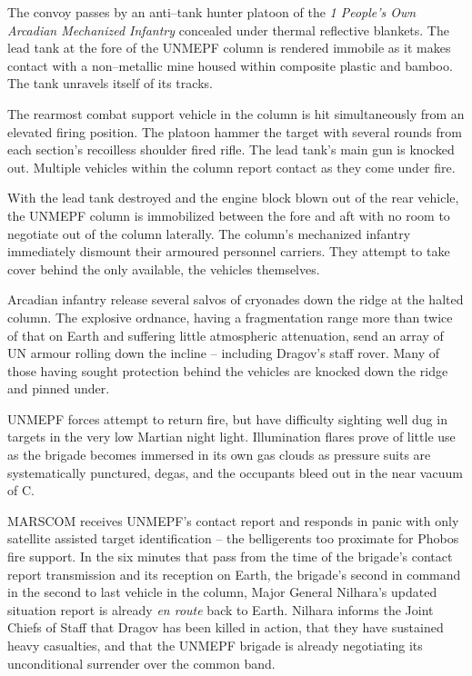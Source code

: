 The convoy passes by an anti--tank hunter platoon of the {\it 1 People's Own Arcadian Mechanized Infantry} concealed under thermal reflective blankets. The lead tank at the fore of the UNMEPF column is rendered immobile as it makes contact with a non--metallic mine housed within composite plastic and bamboo. The tank unravels itself of its tracks.

The rearmost combat support vehicle in the column is hit simultaneously from an elevated firing position. The platoon hammer the target with several rounds from each section's recoilless shoulder fired rifle. The lead tank's main gun is knocked out. Multiple vehicles within the column report contact as they come under fire.

With the lead tank destroyed and the engine block blown out of the rear vehicle, the UNMEPF column is immobilized between the fore and aft with no room to negotiate out of the column laterally. The column's mechanized infantry immediately dismount their armoured personnel carriers. They attempt to take cover behind the only available, the vehicles themselves. 

Arcadian infantry release several salvos of cryonades down the ridge at the halted column. The explosive ordnance, having a fragmentation range more than twice of that on Earth and suffering little atmospheric attenuation, send an array of UN armour rolling down the incline -- including Dragov's staff rover. Many of those having sought protection behind the vehicles are knocked down the ridge and pinned under.

UNMEPF forces attempt to return fire, but have difficulty sighting well dug in targets in the very low Martian night light. Illumination flares prove of little use as the brigade becomes immersed in its own gas clouds as pressure suits are systematically punctured, degas, and the occupants bleed out in the near vacuum of C.

MARSCOM receives UNMEPF's contact report and responds in panic with only satellite assisted target identification -- the belligerents too proximate for Phobos fire support. In the six minutes that pass from the time of the brigade's contact report transmission and its reception on Earth, the brigade's second in command in the second to last vehicle in the column, Major General Nilhara's updated situation report is already {\it en route} back to Earth. Nilhara informs the Joint Chiefs of Staff that Dragov has been killed in action, that they have sustained heavy casualties, and that the UNMEPF brigade is already negotiating its unconditional surrender over the common band.
\StopTimelineDate

